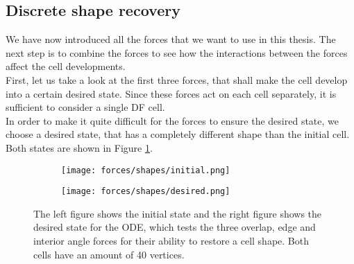 \documentclass[a4paper,12pt,leqno]{article}
\theoremstyle{plain}
\theoremstyle{remark}
\begin{document}
\subsection{Discrete shape recovery} \label{par:shapeRecovery} 
We have now introduced all the forces that we want to use in this thesis. The next step is to combine the forces to see how the interactions between the forces affect the cell developments. \\
First, let us take a look at the first three forces, that shall make the cell develop into a certain desired state. Since these forces act on each cell separately, it is sufficient to consider a single DF cell. \\
In order to make it quite difficult for the forces to ensure the desired state, we choose a desired state, that has a completely different shape than the initial cell. Both states are shown in Figure \ref{fig:shaperrrs}. \\
\begin{figure}[h!]
	\centering
	\centering
	\begin{subfigure}{0.4\textwidth}
		\texttt{[image: forces/shapes/initial.png]}
		
	\end{subfigure}
	\hfill
	\begin{subfigure}{0.4\textwidth}
		\texttt{[image: forces/shapes/desired.png]}
	\end{subfigure}

	\caption{The left figure shows the initial state and the right figure shows the desired state for the ODE, which tests the three overlap, edge and interior angle forces for their ability to restore a cell shape. Both cells have an amount of 40 vertices.}
	\label{fig:shaperrrs}
\end{figure}
\end{document}
